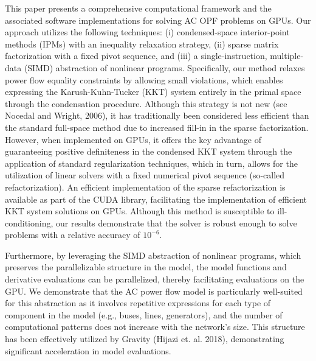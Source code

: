This paper presents a comprehensive computational framework and the associated software implementations for solving AC OPF problems on GPUs. Our approach utilizes the following techniques: (i) condensed-space interior-point methods (IPMs) with an inequality relaxation strategy, (ii) sparse matrix factorization with a fixed pivot sequence, and (iii) a single-instruction, multiple-data (SIMD) abstraction of nonlinear programs. Specifically, our method relaxes power flow equality constraints by allowing small violations, which enables expressing the Karush-Kuhn-Tucker (KKT) system entirely in the primal space through the condensation procedure. Although this strategy is not new (see Nocedal and Wright, 2006), it has traditionally been considered less efficient than the standard full-space method due to increased fill-in in the sparse factorization. However, when implemented on GPUs, it offers the key advantage of guaranteeing positive definiteness in the condensed KKT system through the application of standard regularization techniques, which in turn, allows for the utilization of linear solvers with a fixed numerical pivot sequence (so-called refactorization). An efficient implementation of the sparse refactorization is available as part of the CUDA library, facilitating the implementation of efficient KKT system solutions on GPUs. Although this method is susceptible to ill-conditioning, our results demonstrate that the solver is robust enough to solve problems with a relative accuracy of $10^{-6}$.

Furthermore, by leveraging the SIMD abstraction of nonlinear programs, which preserves the parallelizable structure in the model, the model functions and derivative evaluations can be parallelized, thereby facilitating evaluations on the GPU. We demonstrate that the AC power flow model is particularly well-suited for this abstraction as it involves repetitive expressions for each type of component in the model (e.g., buses, lines, generators), and the number of computational patterns does not increase with the network's size. This structure has been effectively utilized by Gravity (Hijazi et. al. 2018), demonstrating significant acceleration in model evaluations.

